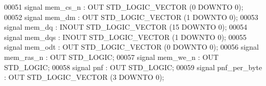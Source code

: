 \begin{DoxyCode}
{00051                  \textcolor{keywordflow}{signal} \textcolor{vhdlchar}{mem_cs_n} \textcolor{vhdlchar}{:} \textcolor{keywordflow}{OUT} \textcolor{comment}{STD\_LOGIC\_VECTOR} \textcolor{vhdlchar}{(}\textcolor{vhdllogic}{}\textcolor{vhdllogic}{0} \textcolor{keywordflow}{DOWNTO} \textcolor{vhdllogic}{}\textcolor{vhdllogic}{0}\textcolor{vhdlchar}{)};
00052                  \textcolor{keywordflow}{signal} \textcolor{vhdlchar}{mem_dm} \textcolor{vhdlchar}{:} \textcolor{keywordflow}{OUT} \textcolor{comment}{STD\_LOGIC\_VECTOR} \textcolor{vhdlchar}{(}\textcolor{vhdllogic}{}\textcolor{vhdllogic}{1} \textcolor{keywordflow}{DOWNTO} \textcolor{vhdllogic}{}\textcolor{vhdllogic}{0}\textcolor{vhdlchar}{)};
00053                  \textcolor{keywordflow}{signal} \textcolor{vhdlchar}{mem_dq} \textcolor{vhdlchar}{:} \textcolor{keywordflow}{INOUT} \textcolor{comment}{STD\_LOGIC\_VECTOR} \textcolor{vhdlchar}{(}\textcolor{vhdllogic}{}\textcolor{vhdllogic}{15} \textcolor{keywordflow}{DOWNTO} \textcolor{vhdllogic}{}\textcolor{vhdllogic}{0}\textcolor{vhdlchar}{)};
00054                  \textcolor{keywordflow}{signal} \textcolor{vhdlchar}{mem_dqs} \textcolor{vhdlchar}{:} \textcolor{keywordflow}{INOUT} \textcolor{comment}{STD\_LOGIC\_VECTOR} \textcolor{vhdlchar}{(}\textcolor{vhdllogic}{}\textcolor{vhdllogic}{1} \textcolor{keywordflow}{DOWNTO} \textcolor{vhdllogic}{}\textcolor{vhdllogic}{0}\textcolor{vhdlchar}{)};
00055                  \textcolor{keywordflow}{signal} \textcolor{vhdlchar}{mem_odt} \textcolor{vhdlchar}{:} \textcolor{keywordflow}{OUT} \textcolor{comment}{STD\_LOGIC\_VECTOR} \textcolor{vhdlchar}{(}\textcolor{vhdllogic}{}\textcolor{vhdllogic}{0} \textcolor{keywordflow}{DOWNTO} \textcolor{vhdllogic}{}\textcolor{vhdllogic}{0}\textcolor{vhdlchar}{)};
00056                  \textcolor{keywordflow}{signal} \textcolor{vhdlchar}{mem_ras_n} \textcolor{vhdlchar}{:} \textcolor{keywordflow}{OUT} \textcolor{comment}{STD\_LOGIC};
00057                  \textcolor{keywordflow}{signal} \textcolor{vhdlchar}{mem_we_n} \textcolor{vhdlchar}{:} \textcolor{keywordflow}{OUT} \textcolor{comment}{STD\_LOGIC};
00058                  \textcolor{keywordflow}{signal} \textcolor{vhdlchar}{pnf} \textcolor{vhdlchar}{:} \textcolor{keywordflow}{OUT} \textcolor{comment}{STD\_LOGIC};
00059                  \textcolor{keywordflow}{signal} \textcolor{vhdlchar}{pnf_per_byte} \textcolor{vhdlchar}{:} \textcolor{keywordflow}{OUT} \textcolor{comment}{STD\_LOGIC\_VECTOR} \textcolor{vhdlchar}{(}\textcolor{vhdllogic}{}\textcolor{vhdllogic}{3} \textcolor{keywordflow}{DOWNTO} \textcolor{vhdllogic}{}\textcolor{vhdllogic}{0}\textcolor{vhdlchar}{)};
}
\end{DoxyCode}
